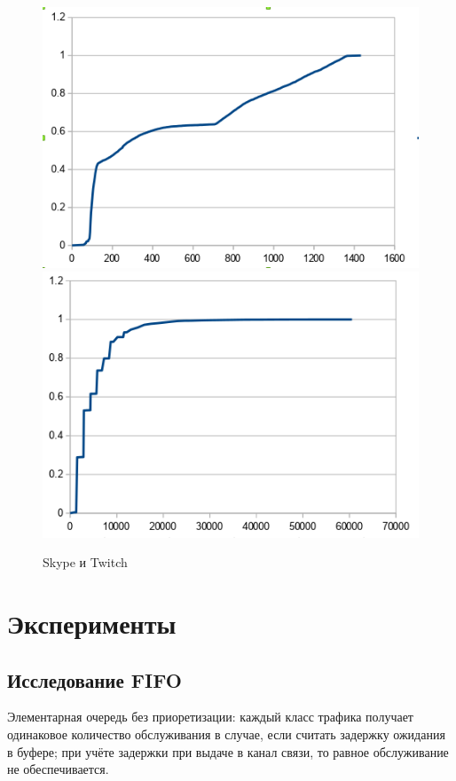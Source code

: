 \documentclass[12pt, a4paper] {ncc}
\begin{document}
	\begin{figure}[h!]
    	\includegraphics[scale=0.5]{./img/skype_size_distr.png}
    	\includegraphics[scale=0.5]{./img/twitch_size_dist.png}
		\caption{Skype и Twitch}
	\end{figure}

\section*{Эксперименты}
	\subsection*{Исследование FIFO}
        Элементарная очередь без приоретизации: каждый класс трафика получает одинаковое количество
        обслуживания в случае, если считать задержку ожидания в буфере; при учёте задержки при выдаче
        в канал связи, то равное обслуживание не обеспечивается. 
\end{document}
